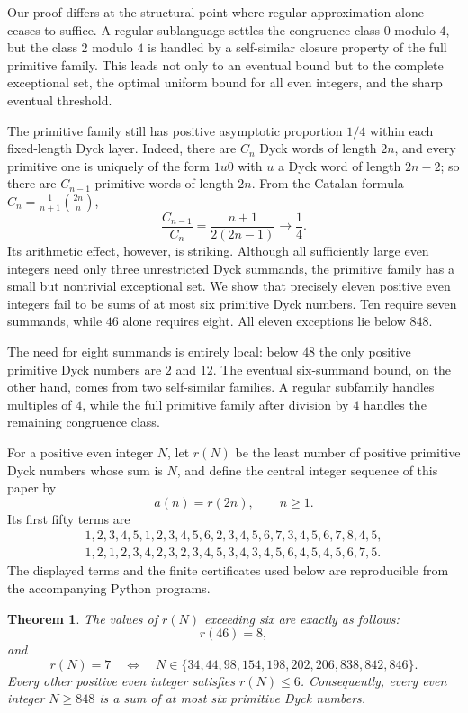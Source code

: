 \documentclass[12pt]{article}
\theoremstyle{plain}
\newtheorem{theorem}{Theorem}
\begin{document}
Our proof differs at the structural point where regular approximation
alone ceases to suffice.  A regular sublanguage settles the congruence
class $0$ modulo $4$, but the class $2$ modulo $4$ is handled by a
self-similar closure property of the full primitive family.  This leads
not only to an eventual bound but to the complete exceptional set, the
optimal uniform bound for all even integers, and the sharp eventual
threshold.

The primitive family still has positive asymptotic proportion $1/4$
within each fixed-length Dyck layer.  Indeed, there are $C_n$ Dyck words
of length $2n$, and every primitive one is uniquely of the form $1u0$
with $u$ a Dyck word of length $2n-2$; so there are $C_{n-1}$ primitive
words of length $2n$.  From the Catalan formula
$C_n=\frac1{n+1}\binom{2n}{n}$,
\[
 \frac{C_{n-1}}{C_n}=\frac{n+1}{2(2n-1)}\longrightarrow\frac14 .
\]
Its arithmetic effect, however, is striking.  Although all sufficiently
large even integers need only three unrestricted Dyck summands, the
primitive family has a small but nontrivial exceptional set.  We show
that precisely eleven positive even integers fail to be sums of at most
six primitive Dyck numbers.  Ten require seven summands, while $46$
alone requires eight.  All eleven exceptions lie below $848$.

The need for eight summands is entirely local: below $48$ the only
positive primitive Dyck numbers are $2$ and $12$.  The eventual
six-summand bound, on the other hand, comes from two self-similar
families.  A regular subfamily handles multiples of $4$, while the full
primitive family after division by $4$ handles the remaining congruence
class.

For a positive even integer $N$, let $r(N)$ be the least number of
positive primitive Dyck numbers whose sum is $N$, and define the central
integer sequence of this paper by
\[
        a(n)=r(2n),\qquad n\geq1.
\]
Its first fifty terms are
\[
\begin{gathered}
1,2,3,4,5,1,2,3,4,5,6,2,3,4,5,6,7,3,4,5,6,7,8,4,5,\\
1,2,1,2,3,4,2,3,2,3,4,5,3,4,3,4,5,6,4,5,4,5,6,7,5.
\end{gathered}
\]
The displayed terms and the finite certificates used below are
reproducible from the accompanying Python programs.

\begin{theorem}\label{thm:main}
The values of $r(N)$ exceeding six are exactly as follows:
\[
 r(46)=8,
\]
and
\[
 r(N)=7
 \quad\Longleftrightarrow\quad
 N\in\{34,44,98,154,198,202,206,838,842,846\}.
\]
Every other positive even integer satisfies $r(N)\leq6$.  Consequently,
every even integer $N\geq848$ is a sum of at most six primitive Dyck
numbers.
\end{theorem}
\end{document}
